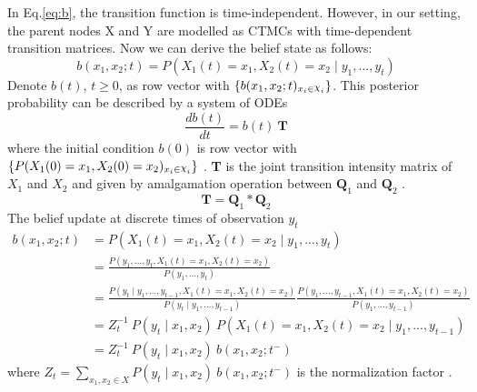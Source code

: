 In Eq.\ref{eq:b}, the transition function is time-independent. However, in our setting, the parent nodes X and Y are modelled as CTMCs with time-dependent transition matrices. 
Now we can derive the belief state as follows: 
\begin{equation}
b(x_{1}, x_{2}; t) = P( X_{1}(t) = x_{1},  X_{2}(t) = x_{2}\mid y_{1}, ..., y_{t})
\end{equation}
Denote $ b(t) $, $ t \geq 0 $, as row vector with $ \left\lbrace b(x_{1}, x_{2};t)_{x_{i} \in \rchi_{i}}\right\rbrace  $.
This posterior probability can be described by a system of ODEs
\begin{equation}
\frac{db(t)}{dt} = b(t)\ \textbf{T}
\end{equation}
where the initial condition $ b(0) $ is row vector with $ \left\lbrace P(X_{1}(0)=x_{1}, X_{2}(0)=x_{2})_{x_{i} \in \rchi_{i}}\right\rbrace $ \cite{article}.
\textbf{T} is the joint transition intensity matrix of $ X_{1} $ and $ X_{2} $ and given by amalgamation operation between $ \textbf{Q}_{1} $ and  $ \textbf{Q}_{2} $ \cite{Nodelman1995}.
\begin{equation}
\textbf{T} = \textbf{Q}_{1} * \textbf{Q}_{2}
\end{equation}
The belief update at discrete times of observation $ y_{t} $
\begin{align}
b(x_{1}, x_{2}; t) & = P( X_{1}(t) = x_{1},  X_{2}(t) = x_{2}\mid y_{1}, ..., y_{t}) \nonumber\\ & = \frac{P(y_{1}, ..., y_{t}, X_{1}(t) = x_{1},  X_{2}(t) = x_{2})}{P(y_{1}, ..., y_{t})}  \nonumber\\ & = \frac{P(y_{t} \mid y_{1}, ..., y_{t-1}, X_{1}(t) = x_{1},  X_{2}(t) = x_{2})}{P(y_{t} \mid y_{1}, ..., y_{t-1})} \frac{P(y_{1}, ..., y_{t-1}, X_{1}(t) = x_{1},  X_{2}(t) = x_{2})}{P(y_{1}, ..., y_{t-1})}  \nonumber\\ & = Z_{t}^{-1} \ P(y_{t} \mid x_{1}, x_{2})\ P( X_{1}(t) = x_{1},  X_{2}(t) = x_{2}\mid y_{1}, ..., y_{t-1})  \nonumber\\ & = Z_{t}^{-1}\ {P(y_{t} \mid x_{1}, x_{2})}\ {b(x_{1}, x_{2}; t^{-})}
\end{align}
where $ Z_{t} = \sum_{x_{1}, x_{2}\in X} P(y_{t} \mid x_{1}, x_{2})\ b(x_{1}, x_{2}; t^{-}) $ is the normalization factor \cite{article}.
